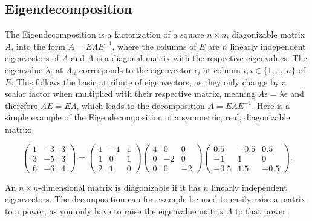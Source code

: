 \subsection{Eigendecomposition}\label{sec:eigen}

The Eigendecomposition is a factorization of a square $n \times n$,
diagonizable matrix $A$, into the form $A = E \Lambda E^{-1}$, where the
columns of $E$ are $n$ linearly independent eigenvectors of $A$ and
$\Lambda$ is a diagonal matrix with the respective eigenvalues. The
eigenvalue $\lambda_i$ at $\Lambda_{ii}$ corresponds to the eigenvector
$\epsilon_i$ at column $i, i \in \{1,\dots,n\}$ of $E$. This follows the
basic attribute of eigenvectors, as they only change by a scalar factor
when multiplied with their respective matrix, meaning $A \epsilon =
\lambda \epsilon$ and therefore $A E = E \Lambda$, which leads to the
decomposition $A = E \Lambda E^{-1}$. Here is a simple example of the
Eigendecomposition of a symmetric, real, diagonizable matrix:

\begin{equation}
  \begin{pmatrix}
    1 & {-3} & 3\\
    3 & {-5} & 3\\
    6 & {-6} & 4
  \end{pmatrix}
  =
  \begin{pmatrix}
    1 & {-1} & 1\\
    1 & 0 & 1\\
    2 & 1 & 0
  \end{pmatrix}
  \begin{pmatrix}
    4 & 0 & 0\\
    0 & {-2} & 0\\
    0 & 0 & {-2}
  \end{pmatrix}
  \begin{pmatrix}
    0.5 & {-0.5} & 0.5\\
    {-1} & 1 & 0\\
    {-0.5} & 1.5 & {-0.5}
  \end{pmatrix}
  .
\end{equation}

\noindent An $n \times n$-dimensional matrix is diagonizable if it has
$n$ linearly independent eigenvectors. The decomposition can for example
be used to easily raise a matrix to a power, as you only have to raise
the eigenvalue matrix $\Lambda$ to that power:

